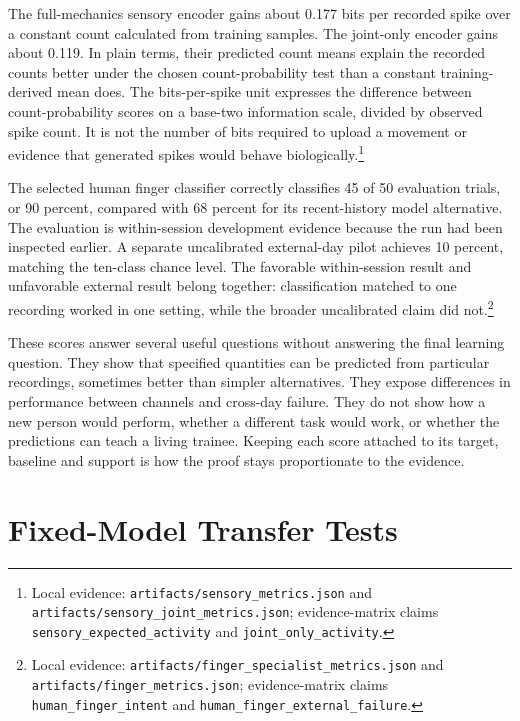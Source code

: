The full-mechanics sensory encoder gains about 0.177 bits per recorded spike over a constant count calculated from training samples. The joint-only encoder gains about 0.119. In plain terms, their predicted count means explain the recorded counts better under the chosen count-probability test than a constant training-derived mean does. The bits-per-spike unit expresses the difference between count-probability scores on a base-two information scale, divided by observed spike count. It is not the number of bits required to upload a movement or evidence that generated spikes would behave biologically.\footnote{Local evidence: \texttt{artifacts/sensory\_metrics.json} and \texttt{artifacts/\allowbreak{}sensory\_\allowbreak{}joint\_\allowbreak{}metrics.json}; evidence-matrix claims \texttt{sensory\_expected\_activity} and \texttt{joint\_only\_activity}.}

The selected human finger classifier correctly classifies 45 of 50 evaluation trials, or 90 percent, compared with 68 percent for its recent-history model alternative. The evaluation is within-session development evidence because the run had been inspected earlier. A separate uncalibrated external-day pilot achieves 10 percent, matching the ten-class chance level. The favorable within-session result and unfavorable external result belong together: classification matched to one recording worked in one setting, while the broader uncalibrated claim did not.\footnote{Local evidence: \texttt{artifacts/finger\_specialist\_metrics.json} and \texttt{\mbox{artifacts}/\allowbreak{}\mbox{finger}\_\allowbreak{}\mbox{metrics}.\allowbreak{}\mbox{json}}; evidence-matrix claims \texttt{human\_finger\_intent} and \texttt{\mbox{human}\_\allowbreak{}\mbox{finger}\_\allowbreak{}\mbox{external}\_\allowbreak{}\mbox{failure}}.}

These scores answer several useful questions without answering the final learning question. They show that specified quantities can be predicted from particular recordings, sometimes better than simpler alternatives. They expose differences in performance between channels and cross-day failure. They do not show how a new person would perform, whether a different task would work, or whether the predictions can teach a living trainee. Keeping each score attached to its target, baseline and support is how the proof stays proportionate to the evidence.

\section{Fixed-Model Transfer Tests}

